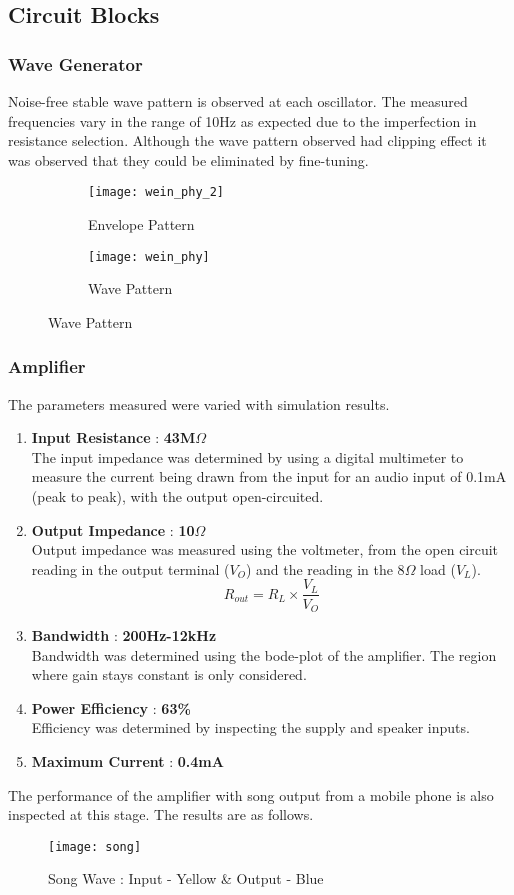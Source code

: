 \subsection{Circuit Blocks}
\subsubsection*{Wave Generator}
Noise-free stable wave pattern is observed at each oscillator. The measured frequencies vary in the range of 10Hz as expected due to the imperfection in resistance selection. Although the wave pattern observed had  clipping effect it was observed that they could be eliminated by fine-tuning.
\begin{figure}[h]
    \begin{subfigure}{.48\columnwidth}
        \texttt{[image: wein\_phy\_2]}
        \caption*{Envelope Pattern}
    \end{subfigure}
    \begin{subfigure}{.48\columnwidth}
        \texttt{[image: wein\_phy]}
        \caption*{Wave Pattern}
    \end{subfigure}
\end{figure}

\subsubsection*{Amplifier}
The parameters measured were varied with simulation results.
\begin{enumerate}
    \item \textbf{Input Resistance} : \textbf{43M$\Omega$}\\The input impedance was determined by using a digital multimeter to measure the current being drawn from the input for an audio input of 0.1mA (peak to peak), with the output open-circuited.
    \item \textbf{Output Impedance} : \textbf{10$\Omega$}\\Output impedance was measured using the voltmeter, from the open circuit reading in the output terminal ($V_O$) and the reading in the 8$\Omega$ load ($V_L$).
          $$R_{out}=R_L\times\frac{V_L}{V_O}$$
    \item \textbf{Bandwidth} : \textbf{200Hz-12kHz}\\Bandwidth was determined using the bode-plot of the amplifier. The region where gain stays constant is only considered.
    \item \textbf{Power Efficiency} : \textbf{63\%}\\
          Efficiency was determined by inspecting the supply and speaker inputs.
    \item \textbf{Maximum Current} : \textbf{0.4mA}
\end{enumerate}
The performance of the amplifier with song output from a mobile phone is also inspected at this stage. The results are as follows.
\begin{figure}[h]
    \texttt{[image: song]}
    \caption*{Song Wave : Input - Yellow \& Output - Blue}
\end{figure}

